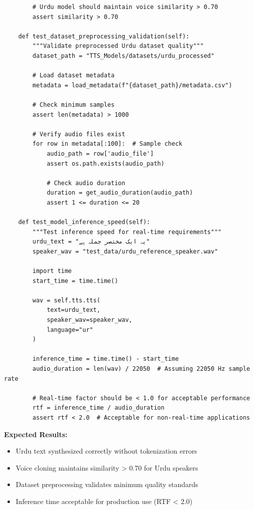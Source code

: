\begin{verbatim}
        # Urdu model should maintain voice similarity > 0.70
        assert similarity > 0.70
    
    def test_dataset_preprocessing_validation(self):
        """Validate preprocessed Urdu dataset quality"""
        dataset_path = "TTS_Models/datasets/urdu_processed"
        
        # Load dataset metadata
        metadata = load_metadata(f"{dataset_path}/metadata.csv")
        
        # Check minimum samples
        assert len(metadata) > 1000
        
        # Verify audio files exist
        for row in metadata[:100]:  # Sample check
            audio_path = row['audio_file']
            assert os.path.exists(audio_path)
            
            # Check audio duration
            duration = get_audio_duration(audio_path)
            assert 1 <= duration <= 20
    
    def test_model_inference_speed(self):
        """Test inference speed for real-time requirements"""
        urdu_text = "یہ ایک مختصر جملہ ہے"
        speaker_wav = "test_data/urdu_reference_speaker.wav"
        
        import time
        start_time = time.time()
        
        wav = self.tts.tts(
            text=urdu_text,
            speaker_wav=speaker_wav,
            language="ur"
        )
        
        inference_time = time.time() - start_time
        audio_duration = len(wav) / 22050  # Assuming 22050 Hz sample rate
        
        # Real-time factor should be < 1.0 for acceptable performance
        rtf = inference_time / audio_duration
        assert rtf < 2.0  # Acceptable for non-real-time applications
\end{verbatim}

\textbf{Expected Results:}
\begin{itemize}
    \item Urdu text synthesized correctly without tokenization errors
    \item Voice cloning maintains similarity > 0.70 for Urdu speakers
    \item Dataset preprocessing validates minimum quality standards
    \item Inference time acceptable for production use (RTF < 2.0)
\end{itemize}

